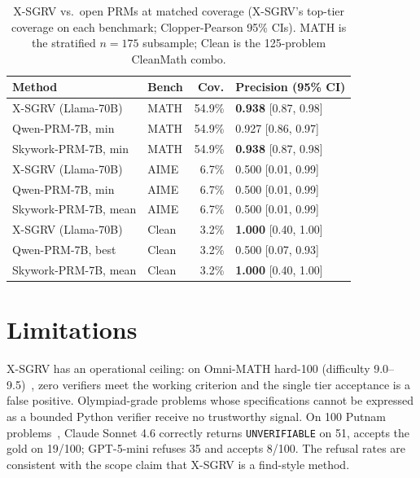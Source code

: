 \documentclass{article}
\begin{document}
\begin{table}[t]
\centering
\caption{X-SGRV vs.\ open PRMs at matched coverage (X-SGRV's top-tier
coverage on each benchmark; Clopper-Pearson 95\% CIs). MATH is the
stratified $n{=}175$ subsample; Clean is the 125-problem CleanMath combo.}
\label{tab:prm}
\footnotesize
\setlength{\tabcolsep}{3pt}
\begin{tabular}{@{}llrl@{}}
\toprule
Method & Bench & Cov. & Precision (95\% CI) \\
\midrule
X-SGRV (Llama-70B)   & MATH  & 54.9\% & \textbf{0.938} [0.87, 0.98] \\
Qwen-PRM-7B, min     & MATH  & 54.9\% & 0.927 [0.86, 0.97] \\
Skywork-PRM-7B, min  & MATH  & 54.9\% & \textbf{0.938} [0.87, 0.98] \\
\midrule
X-SGRV (Llama-70B)   & AIME  &  6.7\% & 0.500 [0.01, 0.99] \\
Qwen-PRM-7B, min     & AIME  &  6.7\% & 0.500 [0.01, 0.99] \\
Skywork-PRM-7B, mean & AIME  &  6.7\% & 0.500 [0.01, 0.99] \\
\midrule
X-SGRV (Llama-70B)   & Clean &  3.2\% & \textbf{1.000} [0.40, 1.00] \\
Qwen-PRM-7B, best    & Clean &  3.2\% & 0.500 [0.07, 0.93] \\
Skywork-PRM-7B, mean & Clean &  3.2\% & \textbf{1.000} [0.40, 1.00] \\
\bottomrule
\end{tabular}
\end{table}

\section{Limitations}

X-SGRV has an operational ceiling: on Omni-MATH hard-100 (difficulty 9.0--9.5)~\citep{omnimath2024}, zero verifiers meet the working criterion and the single tier acceptance is a false positive. Olympiad-grade problems whose specifications cannot be expressed as a bounded Python verifier receive no trustworthy signal. On 100 Putnam problems~\citep{amitayusht2024putnambench}, Claude Sonnet 4.6 correctly returns \texttt{UNVERIFIABLE} on 51, accepts the gold on 19/100; GPT-5-mini refuses 35 and accepts 8/100. The refusal rates are consistent with the scope claim that X-SGRV is a find-style method.
\end{document}
